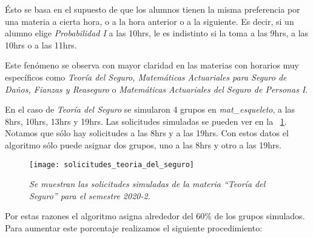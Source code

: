 Ésto se basa en el supuesto de que los alumnos tienen la misma preferencia por una materia a cierta hora, o a la hora anterior o a la siguiente. Es decir, si un alumno elige \textit{Probabilidad I} a las 10hrs, le es indistinto si la toma a las 9hrs, a las 10hrs o a las 11hrs.

Este fenómeno se observa con mayor claridad en las materias con horarios muy específicos como \textit{Teoría del Seguro, Matemáticas Actuariales para Seguro de Daños, Fianzas y Reaseguro} o \textit{Matemáticas Actuariales del Seguro de Personas I}.

En el caso de \textit{Teoría del Seguro} se simularon 4 grupos en \textit{mat\_esqueleto}, a las 8hrs, 10hrs, 13hrs y 19hrs. Las solicitudes simuladas se pueden ver en la \figurename{~\ref{sol_TeoSeguro}}. Notamos que sólo hay solicitudes a las 8hrs y a las 19hrs. Con estos datos el algoritmo sólo puede asignar dos grupos, uno a las 8hrs y otro a las 19hrs.

\begin{figure}[H]
\centering
\texttt{[image: solicitudes\_teoria\_del\_seguro]} %
\caption[\textit{Solicitudes simuladas de la materia ``Teoría del Seguro'' para el semestre 2020-2}]{\textit{Se muestran las solicitudes simuladas de la materia ``Teoría del Seguro'' para el semestre 2020-2.}}\label{sol_TeoSeguro}
\end{figure}

Por estas razones el algoritmo asigna alrededor del $60\%$ de los grupos simulados. Para aumentar este porcentaje realizamos el siguiente procedimiento:

